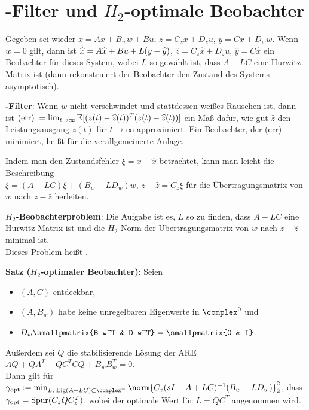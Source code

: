 \pagebreak

\section{%
    -Filter und \texorpdfstring{$H_2$-optimale}{H₂-optimale} Beobachter%
}

Gegeben sei wieder $\dot{x} = Ax + B_w w + Bu$,
$z = C_z x + D_z u$, $y = Cx + D_w w$.
Wenn $w = 0$ gilt, dann ist
$\dotwidehat{x} = A\widehat{x} + Bu + L(y - \widehat{y})$,
$\widehat{z} = C_z \widehat{x} + D_z u$,
$\widehat{y} = C\widehat{x}$
ein Beobachter für dieses System, wobei $L$ so gewählt ist, dass $A - LC$ eine Hurwitz-Matrix ist
(dann rekonstruiert der Beobachter den Zustand des Systems asymptotisch).

\textbf{-Filter}:
Wenn $w$ nicht verschwindet und stattdessen weißes Rauschen ist, dann ist
$\text{(err)} := \lim_{t \to \infty} \mathbb{E}[(z(t) - \widehat{z}(t))^T (z(t) - \widehat{z}(t))]$
ein Maß dafür, wie gut $\widehat{z}$ den Leistungsausgang $z(t)$ für $t \to \infty$ approximiert.
Ein Beobachter, der (err) minimiert, heißt  für die
verallgemeinerte Anlage.

Indem man den Zustandsfehler $\xi = x - \widehat{x}$ betrachtet, kann man leicht die Beschreibung\\
$\dot{\xi} = (A - LC)\xi + (B_w - LD_w) w$,
$z - \widehat{z} = C_z \xi$
für die Übertragungsmatrix von $w$ nach $z - \widehat{z}$ herleiten.

\textbf{$H_2$-Beobachterproblem}:
Die Aufgabe ist es, $L$ so zu finden, dass
$A - LC$ eine Hurwitz-Matrix ist und die $H_2$-Norm der Übertragungsmatrix von $w$ nach
$z - \widehat{z}$ minimal ist.\\
Dieses Problem heißt .

\linie

\textbf{Satz ($H_2$-optimaler Beobachter)}:
Seien
\begin{itemize}
    \item
    $(A, C)$ entdeckbar,

    \item
    $(A, B_w)$ habe keine unregelbaren Eigenwerte in $\complex^0$ und

    \item
    $D_w \smallpmatrix{B_w^T & D_w^T} = \smallpmatrix{0 & I}$.
\end{itemize}
Außerdem sei $Q$ die stabilisierende Lösung der ARE $AQ + QA^T - QC^T CQ + B_w B_w^T = 0$.\\
Dann gilt für
$\gamma_\opt := \min_{L,\;\Eig(A-LC)\subset\complex^-}
\norm{C_z (sI - A + LC)^{-1} (B_w - LD_w)}_2^2$, dass\\
$\gamma_{\text{opt}} = \operatorname{Spur}(C_z Q C_z^T)$, wobei der optimale Wert für $L = QC^T$ angenommen wird.

